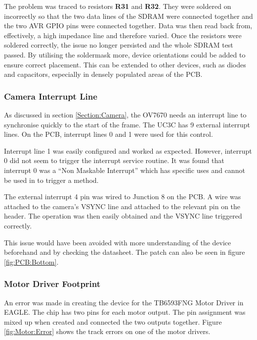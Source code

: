 The problem was traced to resistors \textbf{R31} and \textbf{R32}. They were soldered on incorrectly so that the two data lines of the SDRAM were connected together and the two AVR GPIO pins were connected together. Data was then read back from, effectively, a high impedance line and therefore varied. Once the resistors were soldered correctly, the issue no longer persisted and the whole SDRAM test passed. By utilising the soldermask more, device orientations could be added to ensure correct placement. This can be extended to other devices, such as diodes and capacitors, especially in densely populated areas of the PCB. 

\subsubsection{Camera Interrupt Line}

As discussed in section \ref{Section:Camera}, the OV7670 needs an interrupt line to synchronise quickly to the start of the frame. The UC3C has 9 external interrupt lines. On the PCB, interrupt lines 0 and 1 were used for this control.

Interrupt line 1 was easily configured and worked as expected. However, interrupt 0 did not seem to trigger the interrupt service routine. It was found that interrupt 0 was a ``Non Maskable Interrupt'' which has specific uses and cannot be used in to trigger a method. 

The external interrupt 4 pin was wired to Junction 8 on the PCB. A wire was attached to the camera's VSYNC line and attached to the relevant pin on the header. The operation was then easily obtained and the VSYNC line triggered correctly.

This issue would have been avoided with more understanding of the device beforehand and by checking the datasheet. The patch can also be seen in figure \ref{fig:PCB:Bottom}.


\subsubsection{Motor Driver Footprint}

An error was made in creating the device for the TB6593FNG Motor Driver in EAGLE. 
The chip has two pins for each motor output.%
The pin assignment was mixed up when created and connected the two outputs together. Figure \ref{fig:Motor:Error} shows the track errors on one of the motor drivers. 

